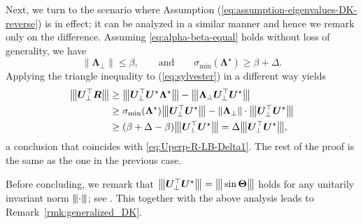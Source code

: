 Next, we turn to the scenario where
 Assumption (\ref{eq:assumption-eigenvalues-DK-reverse}) is in effect; it can be analyzed in a similar manner and hence we remark only on the difference.
Assuming \eqref{eq:alpha-beta-equal} holds without loss of generality, we have
%
\begin{equation}
	\|\bm{\Lambda}_{\perp}\|\leq\beta,\qquad\text{and}\qquad
	\sigma_{\min}(\bm{\Lambda}^{\star}) \geq \beta+\Delta.
	\label{eq:key-estimate-case2}
\end{equation}
%
Applying the triangle inequality  to (\ref{eq:sylvester}) in a different way yields
%
\begin{align*}
\vertiiibig{\bm{U}_{\perp}^{\top}\bm{R}} & \geq\vertiiibig{\bm{U}_{\perp}^{\top}\bm{U}^{\star}\bm{\Lambda}^{\star}}-\vertiiibig{\bm{\Lambda}_{\perp}\bm{U}_{\perp}^{\top}\bm{U}^{\star}}\\
 & \geq\sigma_{\min}(\bm{\Lambda}^{\star})\vertiiibig{\bm{U}_{\perp}^{\top}\bm{U}^{\star}}-\|\bm{\Lambda}_{\perp}\| \cdot \vertiiibig{\bm{U}_{\perp}^{\top}\bm{U}^{\star}}\\
 & \geq(\beta+\Delta-\beta)\vertiiibig{\bm{U}_{\perp}^{\top}\bm{U}^{\star}}=\Delta\vertiiibig{\bm{U}_{\perp}^{\top}\bm{U}^{\star}},
\end{align*}
%
a conclusion that coincides with \eqref{eq:Uperp-R-LB-Delta1}. The rest of the proof is the same as the one in the previous case.





Before concluding, we remark that ${\big\vert\kern-0.25ex\big\vert\kern-0.25ex\big\vert \bm{U}_{\perp}^{\top}\bm{U}^{\star} \big\vert\kern-0.25ex\big\vert\kern-0.25ex\big\vert}={\big\vert\kern-0.25ex\big\vert\kern-0.25ex\big\vert \sin\bm{\Theta} \big\vert\kern-0.25ex\big\vert\kern-0.25ex\big\vert}$
holds for any unitarily invariant norm ${\left\vert\kern-0.25ex\left\vert\kern-0.25ex\left\vert \cdot \right\vert\kern-0.25ex\right\vert\kern-0.25ex\right\vert}$; see \citet[Lemma 2.1]{li1998relative}. This together with the above analysis leads to Remark~\ref{rmk:generalized_DK}.
%

